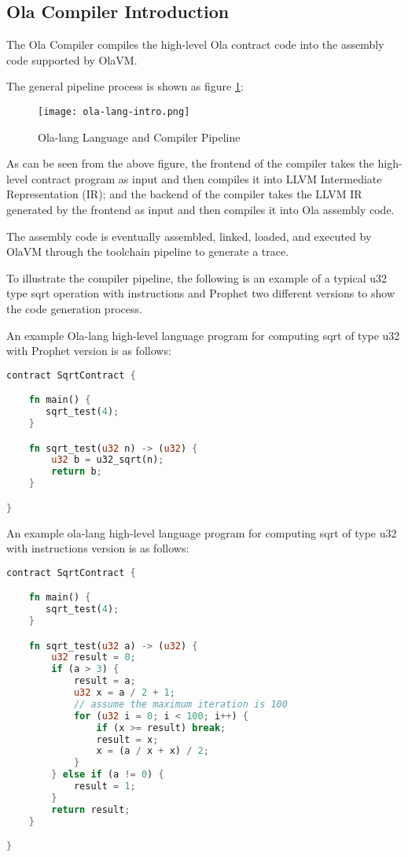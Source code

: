 \subsection{Ola Compiler Introduction}

The Ola Compiler compiles the high-level Ola contract code into the assembly code supported by OlaVM. 

The general pipeline process is shown as figure \ref{fig:ola-lang-intro}:

\begin{figure}[!htp]
    \centering
    \texttt{[image: ola-lang-intro.png]}
    \caption{Ola-lang Language and Compiler Pipeline}
    \label{fig:ola-lang-intro}
\end{figure}

As can be seen from the above figure, the frontend of the compiler takes the high-level contract program as input and then compiles it into LLVM Intermediate Representation (IR);
and the backend of the compiler takes the LLVM IR generated by the frontend as input and then compiles it into Ola assembly code.

The assembly code is eventually assembled, linked, loaded, and executed by OlaVM through the toolchain pipeline to generate a trace.

To illustrate the compiler pipeline, the following is an example of a typical u32 type sqrt operation with instructions and Prophet two different versions to show the code generation process.

An example Ola-lang high-level language program for computing sqrt of type u32 with Prophet version is as follows:
\begin{lstlisting}[language=rust]
contract SqrtContract {

    fn main() {
       sqrt_test(4);
    }

    fn sqrt_test(u32 n) -> (u32) {
        u32 b = u32_sqrt(n);
        return b;
    }

}
\end{lstlisting}


An example ola-lang high-level language program for computing sqrt of type u32 with instructions version is as follows:
\begin{lstlisting}[language=rust]
contract SqrtContract {

    fn main() {
       sqrt_test(4);
    }

    fn sqrt_test(u32 a) -> (u32) {
        u32 result = 0;
        if (a > 3) {
            result = a;
            u32 x = a / 2 + 1;
            // assume the maximum iteration is 100
            for (u32 i = 0; i < 100; i++) {
                if (x >= result) break;
                result = x;
                x = (a / x + x) / 2;
            }
        } else if (a != 0) {
            result = 1;
        }
        return result;
    }

}
\end{lstlisting}
